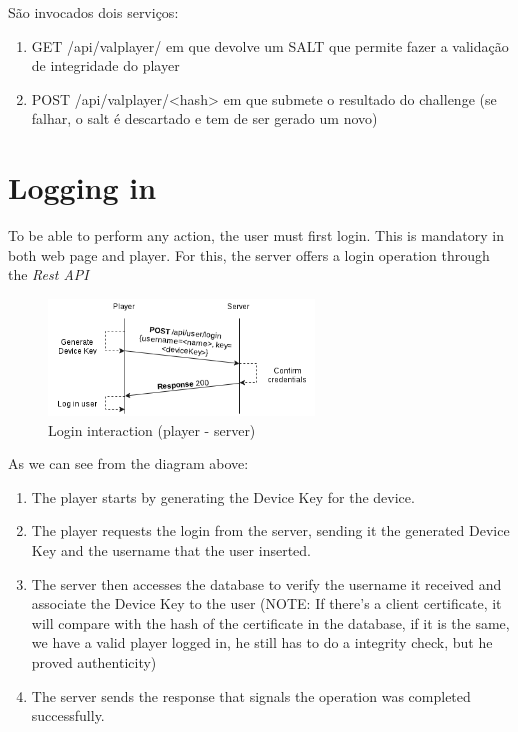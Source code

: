 \documentclass[11pt,a4paper]{report}
\begin{document}
São invocados dois serviços: 
\begin{enumerate}
\item GET   /api/valplayer/ em que devolve um SALT que permite fazer a validação de integridade do player
\item POST  /api/valplayer/<hash> em que submete o resultado do challenge (se falhar, o salt é descartado e tem de ser gerado um novo)
\end{enumerate}

\section{Logging in}
To be able to perform any action, the user must first login. This is mandatory in both web page and player.
\newline For this, the server offers a login operation through the \emph{Rest API}

\begin{figure}[H]
\centerline{\includegraphics[width=200pt]{images/loginDiagram.png}}
\caption{Login interaction (player - server)}
\label{player}
\end{figure}

As we can see from the diagram above:
\begin{enumerate}
  \item The player starts by generating the Device Key for the device. \label{sec:diagfile}
  \item The player requests the login from the server, sending it the generated Device Key and the username that the user inserted. 
  \item The server then accesses the database to verify the username it received and associate the Device Key to the user (NOTE: If there's a client certificate, it will compare with the hash of the certificate in the database, if it is the same, we have a valid player logged in, he still has to do a integrity check, but he proved authenticity)
  \item The server sends the response that signals the operation was completed successfully.
\end{enumerate}
\end{document}
